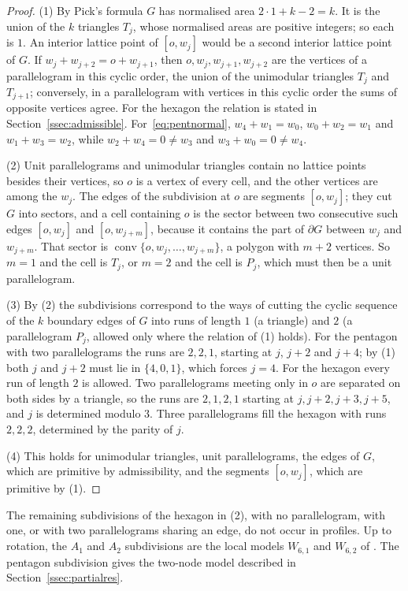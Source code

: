 \begin{proof}
(1) By Pick's formula $G$ has normalised area $2\cdot1+k-2=k$. It is the union of the $k$ triangles $T_j$, whose
normalised areas are positive integers; so each is $1$. An interior lattice point of $[o,w_j]$ would be a second interior
lattice point of $G$. If $w_j+w_{j+2}=o+w_{j+1}$, then $o,w_j,w_{j+1},w_{j+2}$ are the vertices of a parallelogram in this
cyclic order, the union of the unimodular triangles $T_j$ and $T_{j+1}$; conversely, in a parallelogram with vertices in
this cyclic order the sums of opposite vertices agree. For the hexagon the relation is stated in
Section~\ref{ssec:admissible}. For~\eqref{eq:pentnormal}, $w_4+w_1=w_0$, $w_0+w_2=w_1$ and $w_1+w_3=w_2$, while $w_2+w_4=0\ne
w_3$ and $w_3+w_0=0\neq w_4$.

(2) Unit parallelograms and unimodular triangles contain no lattice points besides their vertices, so $o$ is a vertex of
every cell, and the other vertices are among the $w_j$. The edges of the subdivision at $o$ are segments $[o,w_j]$; they
cut $G$ into sectors, and a cell containing $o$ is the sector between two consecutive such edges $[o,w_j]$ and
$[o,w_{j+m}]$, because it contains the part of $\partial G$ between $w_j$ and $w_{j+m}$. That sector is
$\operatorname{conv}\{o,w_j,\dots,w_{j+m}\}$, a polygon with $m+2$ vertices. So $m=1$ and the cell is $T_j$, or $m=2$ and the
cell is $P_j$, which must then be a unit parallelogram.

(3) By (2) the subdivisions correspond to the ways of cutting the cyclic sequence of the $k$ boundary edges of $G$ into
runs of length $1$ (a triangle) and $2$ (a parallelogram $P_j$, allowed only where the relation of (1) holds). For the
pentagon with two parallelograms the runs are $2,2,1$, starting at $j$, $j+2$ and $j+4$; by (1) both $j$ and $j+2$ must
lie in $\{4,0,1\}$, which forces $j=4$. For the hexagon every run of length $2$ is allowed. Two parallelograms meeting
only in $o$ are separated on both sides by a triangle, so the runs are $2,1,2,1$ starting at $j,j+2,j+3,j+5$, and $j$ is
determined modulo $3$. Three parallelograms fill the hexagon with runs $2,2,2$, determined by the parity of $j$.

(4) This holds for unimodular triangles, unit parallelograms, the edges of $G$, which are primitive by admissibility,
and the segments $[o,w_j]$, which are primitive by (1).
\end{proof}

The remaining subdivisions of the hexagon in (2), with no parallelogram, with one, or with two parallelograms sharing an
edge, do not occur in profiles. Up to rotation, the $A_1$ and $A_2$ subdivisions are the local models $W_{6,1}$ and $W_{6,2}$ of
\cite[Prop.~3.7(2),(3)]{Paper5}. The pentagon subdivision gives the two-node model described in
Section~\ref{ssec:partialres}.

